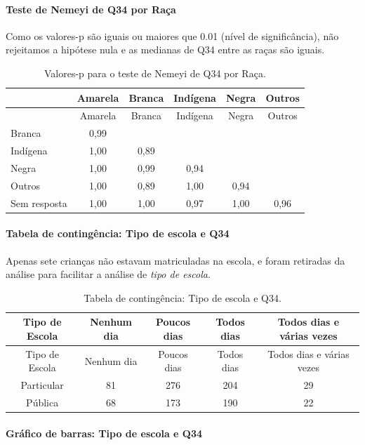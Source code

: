 \documentclass[]{article}
\let\oldparagraph\paragraph
\renewcommand{\paragraph}[1]{\oldparagraph{#1}\mbox{}}
\begin{document}
\hypertarget{teste-de-nemeyi-de-q34-por-rauxe7a}{%
\paragraph{Teste de Nemeyi de Q34 por Raça}\label{teste-de-nemeyi-de-q34-por-rauxe7a}}

Como os valores-p são iguais ou maiores que 0.01 (nível de significância), não rejeitamos a hipótese nula e as medianas de Q34 entre as raças são iguais.

\begin{longtable}[]{@{}lccccc@{}}
\caption{\label{tab:unnamed-chunk-1231}Valores-p para o teste de Nemeyi de Q34 por Raça.}\tabularnewline
\toprule
& Amarela & Branca & Indígena & Negra & Outros\tabularnewline
\midrule
\endfirsthead
\toprule
& Amarela & Branca & Indígena & Negra & Outros\tabularnewline
\midrule
\endhead
Branca & 0,99 & & & &\tabularnewline
Indígena & 1,00 & 0,89 & & &\tabularnewline
Negra & 1,00 & 0,99 & 0,94 & &\tabularnewline
Outros & 1,00 & 0,89 & 1,00 & 0,94 &\tabularnewline
Sem resposta & 1,00 & 1,00 & 0,97 & 1,00 & 0,96\tabularnewline
\bottomrule
\end{longtable}

\cleardoublepage

\hypertarget{tabela-de-continguxeancia-tipo-de-escola-e-q34}{%
\paragraph{Tabela de contingência: Tipo de escola e Q34}\label{tabela-de-continguxeancia-tipo-de-escola-e-q34}}

Apenas sete crianças não estavam matriculadas na escola, e foram retiradas da análise para facilitar a análise de \emph{tipo de escola}.

\begin{longtable}[]{@{}ccccc@{}}
\caption{\label{tab:unnamed-chunk-1232}Tabela de contingência: Tipo de escola e Q34.}\tabularnewline
\toprule
Tipo de Escola & Nenhum dia & Poucos dias & Todos dias & Todos dias e várias vezes\tabularnewline
\midrule
\endfirsthead
\toprule
Tipo de Escola & Nenhum dia & Poucos dias & Todos dias & Todos dias e várias vezes\tabularnewline
\midrule
\endhead
Particular & 81 & 276 & 204 & 29\tabularnewline
Pública & 68 & 173 & 190 & 22\tabularnewline
\bottomrule
\end{longtable}

\hypertarget{gruxe1fico-de-barras-tipo-de-escola-e-q34}{%
\paragraph{Gráfico de barras: Tipo de escola e Q34}\label{gruxe1fico-de-barras-tipo-de-escola-e-q34}}
\end{document}
